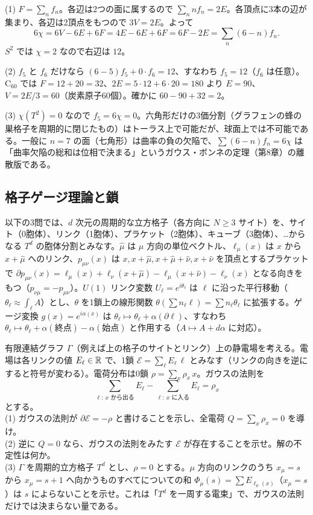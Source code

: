 \begin{solution}
(1) $F=\sum_nf_n$。各辺は2つの面に属するので $\sum_nnf_n=2E$。各頂点に3本の辺が集まり、各辺は2頂点をもつので $3V=2E$。よって
\[
6\chi=6V-6E+6F=4E-6E+6F=6F-2E=\sum_n(6-n)f_n .
\]
$S^2$ では $\chi=2$ なので右辺は $12$。

(2) $f_5$ と $f_6$ だけなら $(6-5)f_5+0\cdot f_6=12$、すなわち $f_5=12$（$f_6$ は任意）。$\mathrm{C}_{60}$ では $F=12+20=32$、$2E=5\cdot12+6\cdot20=180$ より $E=90$、$V=2E/3=60$（炭素原子60個）。確かに $60-90+32=2$。

(3) $\chi(T^2)=0$ なので $f_5=6\chi=0$。六角形だけの3価分割（グラフェンの蜂の巣格子を周期的に閉じたもの）はトーラス上で可能だが、球面上では不可能である。一般に $n=7$ の面（七角形）は曲率の負の欠陥で、$\sum(6-n)f_n=6\chi$ は「曲率欠陥の総和は位相で決まる」というガウス・ボンネの定理（第8章）の離散版である。
\end{solution}

\subsection{格子ゲージ理論と鎖}

以下の3問では、$d$ 次元の周期的な立方格子（各方向に $N\ge3$ サイト）を、サイト（0胞体）、リンク（1胞体）、プラケット（2胞体）、キューブ（3胞体）、…からなる $T^d$ の胞体分割とみなす。$\hat\mu$ は $\mu$ 方向の単位ベクトル、$\ell_\mu(x)$ は $x$ から $x+\hat\mu$ へのリンク、$p_{\mu\nu}(x)$ は $x,x+\hat\mu,x+\hat\mu+\hat\nu,x+\hat\nu$ を頂点とするプラケットで $\partial p_{\mu\nu}(x)=\ell_\mu(x)+\ell_\nu(x+\hat\mu)-\ell_\mu(x+\hat\nu)-\ell_\nu(x)$ となる向きをもつ（$p_{\nu\mu}=-p_{\mu\nu}$）。$U(1)$ リンク変数 $U_\ell=e^{i\theta_\ell}$ は $\ell$ に沿った平行移動（$\theta_\ell\approx\int_\ell A$）とし、$\theta$ を1鎖上の線形関数 $\theta(\sum n_\ell\ell)=\sum n_\ell\theta_\ell$ に拡張する。ゲージ変換 $g(x)=e^{i\alpha(x)}$ は $\theta_\ell\mapsto\theta_\ell+\alpha(\partial\ell)$、すなわち $\theta_{\ell}\mapsto\theta_\ell+\alpha(\text{終点})-\alpha(\text{始点})$ と作用する（$A\mapsto A+d\alpha$ に対応）。

\begin{problem}[難易度 B]\label{ch04-prob-gauss}
有限連結グラフ $\Gamma$（例えば上の格子のサイトとリンク）上の静電場を考える。電場は各リンクの値 $E_\ell\in\mathbb{R}$ で、1鎖 $\mathcal E=\sum_\ell E_\ell\,\ell$ とみなす（リンクの向きを逆にすると符号が変わる）。電荷分布は0鎖 $\rho=\sum_x\rho_x\,x$。ガウスの法則を
\[
\sum_{\ell:\ x\text{ から出る}}E_\ell-\sum_{\ell:\ x\text{ に入る}}E_\ell=\rho_x
\]
とする。\\
(1) ガウスの法則が $\partial\mathcal E=-\rho$ と書けることを示し、全電荷 $Q=\sum_x\rho_x=0$ を導け。\\
(2) 逆に $Q=0$ なら、ガウスの法則をみたす $\mathcal E$ が存在することを示せ。解の不定性は何か。\\
(3) $\Gamma$ を周期的立方格子 $T^d$ とし、$\rho=0$ とする。$\mu$ 方向のリンクのうち $x_\mu=s$ から $x_\mu=s+1$ へ向かうものすべてについての和 $\Phi_\mu(s)=\sum E_{\ell_\mu(x)}$（$x_\mu=s$）は $s$ によらないことを示せ。これは「$T^d$ を一周する電束」で、ガウスの法則だけでは決まらない量である。
\end{problem}


